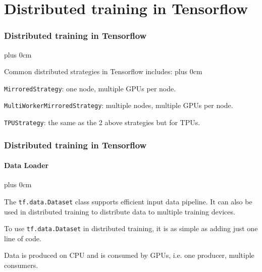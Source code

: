\documentclass[11pt]{beamer}
\renewcommand{\raggedright}{\leftskip=0pt \rightskip=0pt plus 0cm}
\let\olditemize=\itemize
\renewenvironment{itemize}{\olditemize\raggedright}{\endlist}
\begin{document}
\section{Distributed training in Tensorflow}
\frame{\tableofcontents[currentsection]}
\begin{frame}
\frametitle{Distributed training in Tensorflow}
\begin{itemize}
	\item Common distributed strategies in Tensorflow includes:
	\begin{itemize}
		\item \texttt{MirroredStrategy}: one node, multiple GPUs per node.
		\item \texttt{MultiWorkerMirroredStrategy}: multiple nodes, multiple GPUs per node.
		\item \texttt{TPUStrategy}: the same as the 2 above strategies but for TPUs.
	\end{itemize}
\end{itemize}
\end{frame}
\begin{frame}
\frametitle{Distributed training in Tensorflow}
\framesubtitle{Data Loader}
\begin{itemize}
\item The \texttt{tf.data.Dataset} class supports efficient input data pipeline. It can also be used in distributed training to distribute data to multiple training devices.
\item To use \texttt{tf.data.Dataset} in distributed training, it is as simple as adding just one line of code.
\item Data is produced on CPU and is consumed by GPUs, i.e. one producer, multiple consumers.
\end{itemize}
\end{frame}
\end{document}
